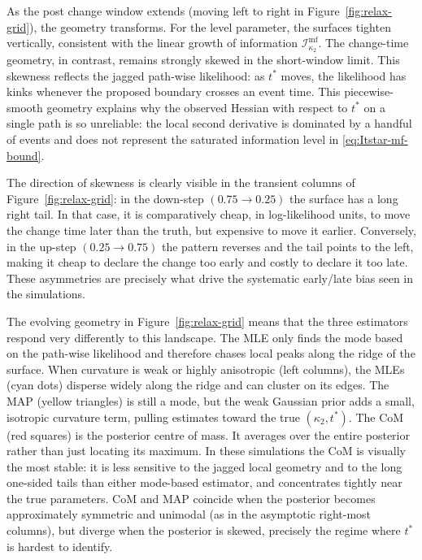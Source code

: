 \documentclass{article}
\theoremstyle{plain}
\theoremstyle{definition}
\newcommand{\1}{\mathbf{1}}
\begin{document}
As the post change window extends (moving left to right in Figure~\ref{fig:relax-grid}), the geometry transforms. For the level parameter, the surfaces tighten vertically, consistent with the linear growth of information $\mathcal I_{\kappa_2}^{\mathrm{mf}}$. The change-time geometry, in contrast, remains strongly skewed in the short-window limit. This skewness reflects the jagged path-wise likelihood: as $t^\ast$ moves, the likelihood has kinks whenever the proposed boundary crosses an event time. This piecewise-smooth geometry explains why the observed Hessian with respect to $t^\ast$ on a single path is so unreliable: the local second derivative is dominated by a handful of events and does not represent the saturated information level in \eqref{eq:Itstar-mf-bound}.

The direction of skewness is clearly visible in the transient columns of Figure~\ref{fig:relax-grid}: in the down-step $(0.75\to0.25)$ the surface has a long right tail. In that case, it is comparatively cheap, in log-likelihood units, to move the change time later than the truth, but expensive to move it earlier. Conversely, in the up-step $(0.25\to0.75)$ the pattern reverses and the tail points to the left, making it cheap to declare the change too early and costly to declare it too late. These asymmetries are precisely what drive the systematic early/late bias seen in the simulations.

The evolving geometry in Figure~\ref{fig:relax-grid} means that the three estimators respond very differently to this landscape. The MLE only finds the mode based on the path-wise likelihood and therefore chases local peaks along the ridge of the surface. When curvature is weak or highly anisotropic (left columns), the MLEs (cyan dots) disperse widely along the ridge and can cluster on its edges. The MAP (yellow triangles) is still a mode, but the weak Gaussian prior adds a small, isotropic curvature term, pulling estimates toward the true $(\kappa_2,t^\ast)$. The CoM (red squares) is the posterior centre of mass. It averages over the entire posterior rather than just locating its maximum. In these simulations the CoM is visually the most stable: it is less sensitive to the jagged local geometry and to the long one-sided tails than either mode-based estimator, and concentrates tightly near the true parameters. CoM and MAP coincide when the posterior becomes approximately symmetric and unimodal (as in the asymptotic right-most columns), but diverge when the posterior is skewed, precisely the regime where $t^\ast$ is hardest to identify.
    
\end{document}
